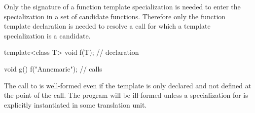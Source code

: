 \pnum
Only the signature of a function template specialization is needed to enter the
specialization in a set of candidate functions.
Therefore only the function template declaration is needed to resolve a call
for which a template specialization is a candidate.
\begin{example}
\begin{codeblock}
template<class T> void f(T);    // declaration

void g() {
  f("Annemarie");               // calls 
}
\end{codeblock}

The call to
is well-formed even if the template
is only declared and not defined at the point of the call.
The program will be ill-formed unless a specialization for
is explicitly instantiated in some translation unit.
\end{example}


